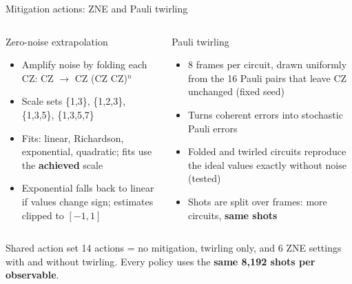 \documentclass[aspectratio=169,11pt]{beamer}
\begin{document}
\begin{frame}{Mitigation actions: ZNE and Pauli twirling}
\footnotesize
\begin{columns}[T]
\begin{block}{Zero-noise extrapolation}
\begin{itemize}
\item Amplify noise by folding each CZ: CZ $\rightarrow$ CZ (CZ CZ)$^n$
\item Scale sets \{1,3\}, \{1,2,3\}, \{1,3,5\}, \{1,3,5,7\}
\item Fits: linear, Richardson, exponential, quadratic; fits use the \textbf{achieved} scale
\item Exponential falls back to linear if values change sign; estimates clipped to $[-1,1]$
\end{itemize}
\end{block}
\begin{block}{Pauli twirling}
\begin{itemize}
\item 8 frames per circuit, drawn uniformly from the 16 Pauli pairs that leave CZ unchanged (fixed seed)
\item Turns coherent errors into stochastic Pauli errors
\item Folded and twirled circuits reproduce the ideal values exactly without noise (tested)
\item Shots are split over frames: more circuits, \textbf{same shots}
\end{itemize}
\end{block}
\end{columns}
\vspace{0.1cm}
\begin{exampleblock}{Shared action set}
14 actions = no mitigation, twirling only, and 6 ZNE settings with and without twirling. Every policy uses the \textbf{same 8,192 shots per observable}.
\end{exampleblock}
\end{frame}
\end{document}
